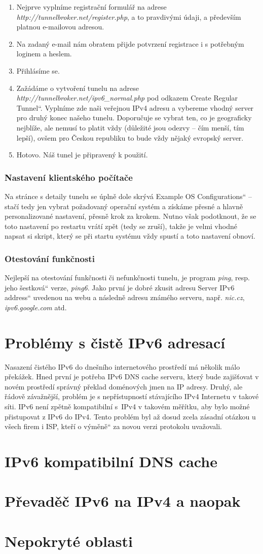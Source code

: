 \documentclass[12pt]{report}
\newcommand\uv[1]{\quotedblbase #1\textquotedblleft}
\begin{document}
\begin{enumerate}
\item Nejprve vyplníme registrační formulář na adrese \textit{http://tunnelbroker.net/register.php}, a to pravdivými údaji, a především platnou e-mailovou adresou.
\item Na zadaný e-mail nám obratem přijde potvrzení registrace i s potřebným loginem a heslem.
\item Přihlásíme se.
\item Zažádáme o vytvoření tunelu na adrese \textit{http://tunnelbroker.net/ipv6\_normal.php} pod odkazem \uv{Create Regular Tunnel}. Vyplníme zde naši veřejnou IPv4 adresu a vybereme vhodný server pro druhý konec našeho tunelu. Doporučuje se vybrat ten, co je geograficky nejblíže, ale nemusí to platit vždy (důležité jsou odezvy -- čím menší, tím lepší), ovšem pro Českou republiku to bude vždy nějaký evropský server.
\item Hotovo. Náš tunel je připravený k použití.
\end{enumerate}

\subsubsection{Nastavení klientského počítače}
Na stránce s detaily tunelu se úplně dole skrývá \uv{Example OS Configurations} -- stačí tedy jen vybrat požadovaný operační systém a získáme přesné a hlavně personalizované nastavení, přesně krok za krokem. Nutno však podotknout, že se toto nastavení po restartu vrátí zpět (tedy se zruší), takže je velmi vhodné napsat si skript, který se při startu systému vždy spustí a toto nastavení obnoví.

\subsubsection{Otestování funkčnosti}
Nejlepší na otestování funkčnosti či nefunkčnosti tunelu, je program \textit{ping}, resp. jeho \uv{šestková} verze, \textit{ping6}. Jako první je dobré zkusit adresu \uv{Server IPv6 address} uvedenou na webu a následně adresu známého serveru, např. \textit{nic.cz}, \textit{ipv6.google.com} atd.

\section{Problémy s čistě IPv6 adresací}
Nasazení čistého IPv6 do dnešního internetového prostředí má několik málo překážek. Hned první je potřeba IPv6 DNS cache serveru, který bude zajišťovat v novém prostředí správný překlad doménových jmen na IP adresy. Druhý, ale řádově závažnější, problém je s nepřístupností stávajícího IPv4 Internetu v takové síti. IPv6 není zpětně kompatibilní s~IPv4 v takovém měřítku, aby bylo možné přistupovat z IPv6 do IPv4. Tento problém byl až dosud zcela zásadní otázkou u všech firem i ISP, kteří o \uv{výměně} za novou verzi protokolu uvažovali.

\section{IPv6 kompatibilní DNS cache}
\section{Převaděč IPv6 na IPv4 a naopak}
\section{Nepokryté oblasti}
\newpage{}
\end{document}
